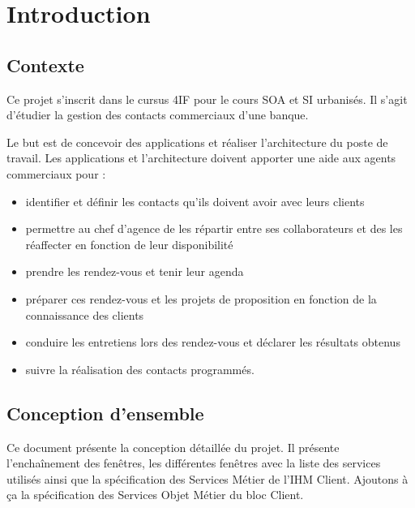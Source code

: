 \section{Introduction}

\subsection{Contexte}


Ce projet s'inscrit dans le cursus 4IF pour le cours SOA et SI urbanisés. Il 
s'agit d'étudier la gestion des contacts commerciaux d'une banque. 

Le but est de concevoir des applications et réaliser l'architecture du poste de 
travail. Les applications et l'architecture doivent apporter une aide aux 
agents commerciaux pour :

\begin{itemize}
	\item	identifier et définir les contacts qu'ils doivent avoir avec leurs 
	clients
	\item permettre au chef d'agence de les répartir entre ses collaborateurs 
	et des les réaffecter en fonction de leur disponibilité
	\item prendre les rendez-vous et tenir leur agenda
	\item préparer ces rendez-vous et les projets de proposition en fonction de 
	la connaissance des clients
	\item conduire les entretiens lors des rendez-vous et déclarer les 
	résultats obtenus
	\item suivre la réalisation des contacts programmés.
\end{itemize}

\subsection{Conception d'ensemble}

Ce document présente la conception détaillée du projet. Il présente 
l'enchaînement des fenêtres, les différentes fenêtres avec la liste des services 
utilisés ainsi que la spécification des Services Métier de l'IHM Client. 
Ajoutons à ça la spécification des Services Objet Métier du bloc Client.
